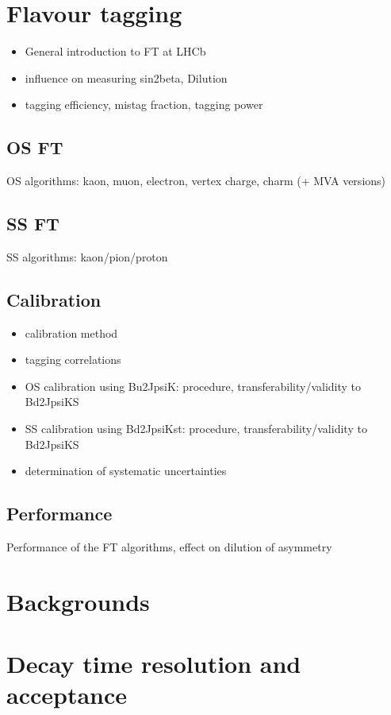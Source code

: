 \section{Flavour tagging}
\begin{itemize}
  \item General introduction to FT at LHCb
  \item influence on measuring sin2beta, Dilution
  \item tagging efficiency, mistag fraction, tagging power
\end{itemize}

\subsection{OS FT}
OS algorithms: kaon, muon, electron, vertex charge, charm (+ MVA versions)

\subsection{SS FT}
SS algorithms: kaon/pion/proton

\subsection{Calibration}
\begin{itemize}
  \item calibration method
  \item tagging correlations
  \item OS calibration using Bu2JpsiK: procedure, transferability/validity to Bd2JpsiKS
  \item SS calibration using Bd2JpsiKst: procedure, transferability/validity to Bd2JpsiKS
  \item determination of systematic uncertainties
\end{itemize}

\subsection{Performance}
Performance of the FT algorithms, effect on dilution of asymmetry

\section{Backgrounds}
\section{Decay time resolution and acceptance}
